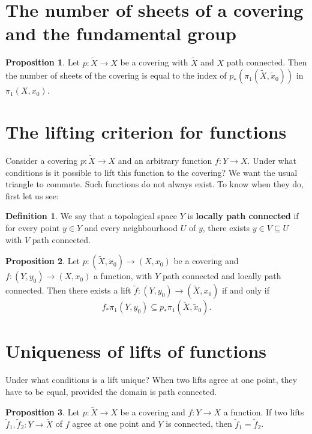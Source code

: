 \documentclass{book}
\theoremstyle{definition}
\newtheorem*{defn}{Definition}
\newtheorem*{prop}{Proposition}
\begin{document}
\section{The number of sheets of a covering and the
fundamental group}

\begin{prop}
Let $p:\tilde X\to X$ be a covering with $\tilde X$ and $X$
path connected. Then the number of sheets of the covering is
equal to the index of $p_*(\pi_1(\tilde X,\tilde x_0))$ in
$\pi_1(X,x_0)$.
\end{prop}

\section{The lifting criterion for functions}

Consider a covering $p:\tilde X\to X$ and an arbitrary
function $f:Y\to X$. Under what conditions is it possible to
lift this function to the covering? We want the usual
triangle to commute. Such functions do not always exist. To
know when they do, first let us see:

\begin{defn}
We say that a topological space $Y$ is \textbf{locally path
connected} if for every point $y\in Y$ and every
neighbourhood $U$ of $y$, there exists
$y\in V\subseteq U$ with $V$ path connected.
\end{defn}

\begin{prop}
Let $p:(\tilde X,\tilde x_0)\to (X,x_0)$ be a covering and
$f:(Y,y_0)\to (X,x_0)$ a function, with $Y$ path connected
and locally path connected. Then there exists a lift
$\tilde f:(Y,y_0)\to(\tilde X,x_0)$ if and only if
$$
f_*\pi_1(Y,y_0)\subseteq
p_*\pi_1(\tilde X,\tilde x_0).
$$
\end{prop}

\section{Uniqueness of lifts of functions}

Under what conditions is a lift unique? When two lifts agree
at one point, they have to be equal, provided the domain is
path connected.

\begin{prop}
Let $p:\tilde X\to X$ be a covering and $f:Y\to X$ a
function. If two lifts $\tilde f_1,\tilde f_2:Y\to\tilde X$
of $f$ agree at one point and $Y$ is connected, then
$\tilde f_1=\tilde f_2$.
\end{prop}
\end{document}

